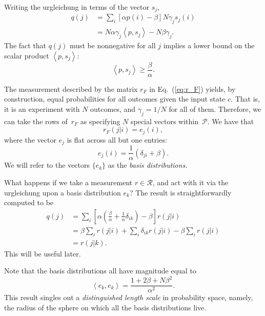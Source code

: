 \documentclass[aps,pra,superscriptaddress,10pt,tightenlines,twocolumn,nofootinbib]{revtex4}
\theoremstyle{remark}
\newcommand{\cP}{\mathcal{P}}
\newcommand{\cR}{\mathcal{R}}
\newcommand{\inprod}[2]{{\left\langle #1 , #2 \right\rangle}}
\begin{document}
Writing the urgleichung in terms of the vector ${s}_j$,
\begin{align}
q(j) &= \sum_i \left[\alpha p(i) - \beta\right] N \gamma_j
        s_j(i) \\
 &= N\alpha \gamma_j \inprod{p}{s_j} - N\beta\gamma_j.
\end{align}
The fact that $q(j)$ must be nonnegative for all $j$ implies a lower
bound on the scalar product $\inprod{p}{s_j}$:
\begin{equation}
\inprod{p}{s_j} \geq \frac{\beta}{\alpha}.
\label{eq:first-lower-bound}
\end{equation}

The measurement described by the matrix $r_F$ in Eq.~(\ref{eq:r_F})
yields, by construction, equal probabilities for all outcomes given
the input state ${c}$.  That is, it is an experiment with $N$
outcomes, and $\gamma_j = 1/N$ for all of them.  Therefore, we can
take the rows of~$r_F$ as specifying $N$ special vectors within~$\cP$.
We have that
\begin{equation}
r_F(j|i) = e_j(i),
\end{equation}
where the vector ${e}_j$ is flat across all but one entries:
\begin{equation}
e_j(i) = \frac{1}{\alpha}(\delta_{ji} + \beta).
\end{equation}
We will refer to the vectors $\{{e}_k\}$ as the \emph{basis
  distributions.}

What happens if we take a measurement $r \in \cR$, and act with it via
the urgleichung upon a basis distribution ${e}_k$?  The result is
straightforwardly computed to be
\begin{align}
q(j) &= \sum_i \left[\alpha\left(\frac{\beta}{\alpha}
                                + \frac{1}{\alpha} \delta_{ik}
                          \right)
                     - \beta
               \right] r(j|i) \\
 &= \beta \sum_i r(j|i) + \sum_i \delta_{ik} r(j|i)
    - \beta \sum_i r(j|i) \\
 &= r(j|k).
\label{eq:r-upon-basis}
\end{align}
This will be useful later.

Note that the basis distributions all have magnitude equal to
\begin{equation}
\inprod{e_k}{e_k} = \frac{1 + 2\beta + N\beta^2}{\alpha^2}.
\label{eq:basis-purity}
\end{equation}
This result singles out a \emph{distinguished length scale} in
probability space, namely, the radius of the sphere on which all the
basis distributions live.
\end{document}
